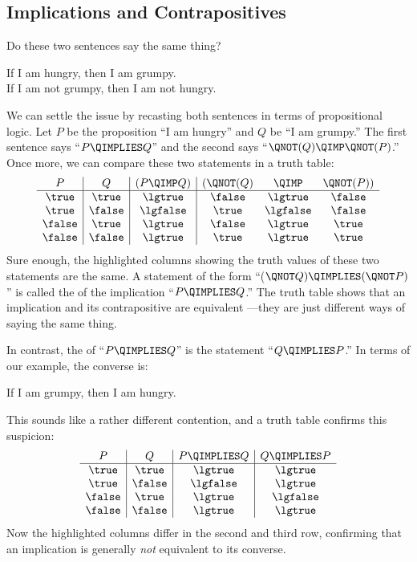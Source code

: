 \subsection{Implications and Contrapositives}\label{implication_sec}
Do these two sentences say the same thing?
%
\begin{center}
If I am hungry, then I am grumpy. \\
If I am not grumpy, then I am not hungry.
\end{center}
%
We can settle the issue by recasting both sentences in terms of
propositional logic.  Let $P$ be the proposition ``I am hungry'' and $Q$
be ``I am grumpy.''  The first sentence says ``$P \QIMPLIES Q$'' and the
second says ``$\QNOT(Q) \QIMP \QNOT(P)$.''  Once more, we can compare
these two statements in a truth table:
%
\[
\begin{array}{c|c|c|ccc}
   P   &   Q    & (P  \QIMP  Q) & (\QNOT(Q) & \QIMP & \QNOT(P)) \\ \hline
\true  & \true  &     \lgtrue   &  \false   & \lgtrue  &  \false\\
\true  & \false &     \lgfalse  &  \true    & \lgfalse &  \false\\
\false & \true  &     \lgtrue   &  \false   & \lgtrue  &  \true \\
\false & \false &     \lgtrue   &  \true    & \lgtrue  &  \true \\
\end{array}
\]
%
Sure enough, the highlighted columns showing the truth values of these two
statements are the same.  A statement of the form ``($\QNOT Q) \QIMPLIES
(\QNOT P)$'' is called the  of the implication ``$P
\QIMPLIES Q$.''  The truth table shows that an implication and its
contrapositive are equivalent ---they are just different ways of saying
the same thing.

In contrast, the  of ``$P \QIMPLIES Q$'' is the statement
``$Q \QIMPLIES P$.''  In terms of our example, the converse is:
%
\begin{center}
If I am grumpy, then I am hungry.
\end{center}
%
This sounds like a rather different contention, and a truth table
confirms this suspicion:
%
\[
\begin{array}{c|c|c|c}
P & Q &
    P \QIMPLIES Q &
    Q \QIMPLIES P \\ \hline
\true & \true & \lgtrue & \lgtrue \\
\true & \false & \lgfalse & \lgtrue \\
\false & \true & \lgtrue & \lgfalse \\
\false & \false & \lgtrue & \lgtrue
\end{array}
\]
%
Now the highlighted columns differ in the second and third row, confirming
that an implication is generally \textit{not} equivalent to its converse.

